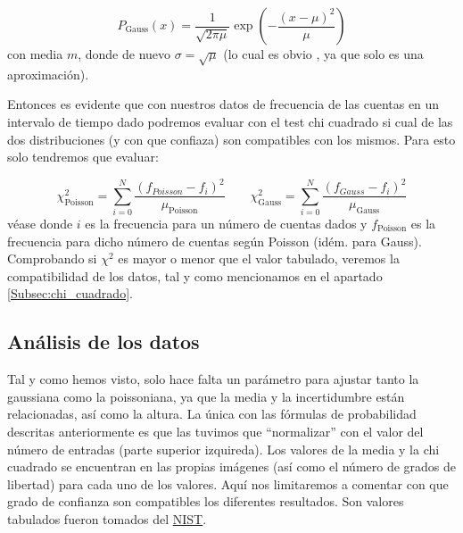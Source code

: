 \documentclass[11pt]{article}
\newcommand{\parentesis}[1]{\left( #1  \right)}
\begin{document}
\begin{equation}
	P_{\text{Gauss}} (x) = \frac{1}{\sqrt{2\pi \mu}} \exp \parentesis{- \frac{(x-\mu)^2}{\mu}}
\end{equation}
con media $m$, donde de nuevo $\sigma=\sqrt{\mu}$ (lo cual es obvio , ya que solo es una aproximación). 

Entonces es evidente que con nuestros datos de frecuencia de las cuentas en un intervalo de tiempo dado podremos evaluar con el test chi cuadrado si cual de las dos distribuciones (y con que confiaza) son compatibles con los mismos. Para esto solo tendremos que evaluar: 

\begin{equation}
	\chi^2_{\text{Poisson}} = \sum_{i=0}^N \frac{(f_{Poisson}-f_i)^2}{\mu_{\text{Poisson}}} \qquad 
	\chi^2_{\text{Gauss}} = \sum_{i=0}^N \frac{(f_{Gauss}-f_i)^2}{\mu_{\text{Gauss}}}
\end{equation}
véase \cite{Bevington:1305448} donde $i$ es la frecuencia para un número de cuentas dados y $f_{\text{Poisson}}$ es la frecuencia para dicho número de cuentas según Poisson (idém. para Gauss). Comprobando si $\chi^2$ es mayor o menor que el valor tabulado, veremos la compatibilidad de los datos, tal y como mencionamos en el apartado \ref{Subsec:chi_cuadrado}.

\subsection{Análisis de los datos}

Tal y como hemos visto, solo hace falta un parámetro para ajustar tanto la gaussiana como la poissoniana, ya que la media y la incertidumbre están relacionadas, así como la altura. La única con las fórmulas de probabilidad descritas anteriormente es que las tuvimos que ``normalizar'' con el valor del número de entradas (parte superior izquireda). Los valores de la media y la chi cuadrado se encuentran en las propias imágenes (así como el número de grados de libertad) para cada uno de los valores. Aquí nos limitaremos a comentar con que grado de confianza son compatibles los diferentes resultados. Son valores tabulados fueron tomados del \href{https://www.itl.nist.gov/div898/handbook/eda/section3/eda3674.htm}{NIST}. 
\end{document}
